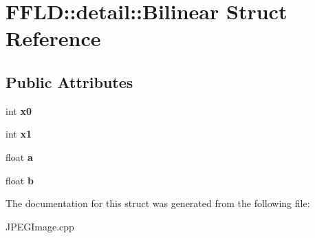 \hypertarget{struct_f_f_l_d_1_1detail_1_1_bilinear}{\section{F\-F\-L\-D\-:\-:detail\-:\-:Bilinear Struct Reference}
\label{struct_f_f_l_d_1_1detail_1_1_bilinear}
}
\subsection*{Public Attributes}
\begin{DoxyCompactItemize}
\item 
\hypertarget{struct_f_f_l_d_1_1detail_1_1_bilinear_a31eb64fa55b8907bccef7fa7aa07b7ca}{int {\bfseries x0}}\label{struct_f_f_l_d_1_1detail_1_1_bilinear_a31eb64fa55b8907bccef7fa7aa07b7ca}

\item 
\hypertarget{struct_f_f_l_d_1_1detail_1_1_bilinear_acc4397ebea5708bd9d2fc9da6ebe7dc8}{int {\bfseries x1}}\label{struct_f_f_l_d_1_1detail_1_1_bilinear_acc4397ebea5708bd9d2fc9da6ebe7dc8}

\item 
\hypertarget{struct_f_f_l_d_1_1detail_1_1_bilinear_ab270f985cf37f5b1062369e6cb412990}{float {\bfseries a}}\label{struct_f_f_l_d_1_1detail_1_1_bilinear_ab270f985cf37f5b1062369e6cb412990}

\item 
\hypertarget{struct_f_f_l_d_1_1detail_1_1_bilinear_a1a4e803551275725eadf55d3281899e8}{float {\bfseries b}}\label{struct_f_f_l_d_1_1detail_1_1_bilinear_a1a4e803551275725eadf55d3281899e8}

\end{DoxyCompactItemize}


The documentation for this struct was generated from the following file\-:\begin{DoxyCompactItemize}
\item 
J\-P\-E\-G\-Image.\-cpp\end{DoxyCompactItemize}

